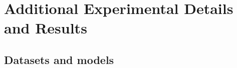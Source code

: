 





\section{Additional Experimental Details and Results}
\label{appendix: additional results and details}



\subsection{Datasets and models}
\label{appendix: datasets and models}

